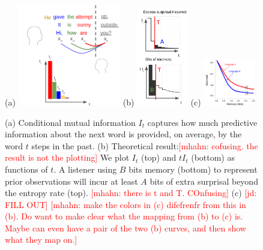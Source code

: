 \documentclass[12pt]{article}
\newcounter{theorem}
\newcommand{\jd}[1]{\textcolor{Red}{[jd: #1]}}
\newcommand{\mhahn}[1]{\textcolor{Red}{[mhahn: #1]}}
\begin{document}
\begin{figure}
	(a)
\includegraphics[width=0.4\textwidth]{figures-gdrive/mi-distance.png}
	(b)
\includegraphics[width=0.2\textwidth]{figures-gdrive/theorem.png}
	(c)
\includegraphics[width=0.2\textwidth]{figures-gdrive/tradeoff.png}
	\caption{
		(a) Conditional mutual information $I_t$ captures how much predictive information about the next word is provided, on average, by the word $t$ steps in the past.
		(b) Theoretical result:\mhahn{cofusing. the result is not the plotting} We plot $I_t$ (top) and $tI_t$ (bottom) as functions of $t$. A listener using $B$ bits memory (bottom) to represent prior observations will incur at least $A$ bits of extra surprisal beyond the entropy rate (top). \mhahn{there is t and T. COnfusing}
		(c) \jd{FILL OUT} \mhahn{make the colors in (c) difefrenfr from this in (b). Do want to make clear what the mapping from (b) to (c) is. Maybe can even have a pair of the two (b) curves, and then show what they map on.}
}\label{fig:theorem}
\end{figure}
\end{document}
